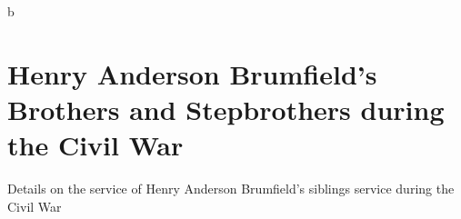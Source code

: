 b
\chapter{Henry Anderson Brumfield's Brothers and Stepbrothers during the Civil War}

Details on the service of Henry Anderson Brumfield's siblings service during the Civil War
